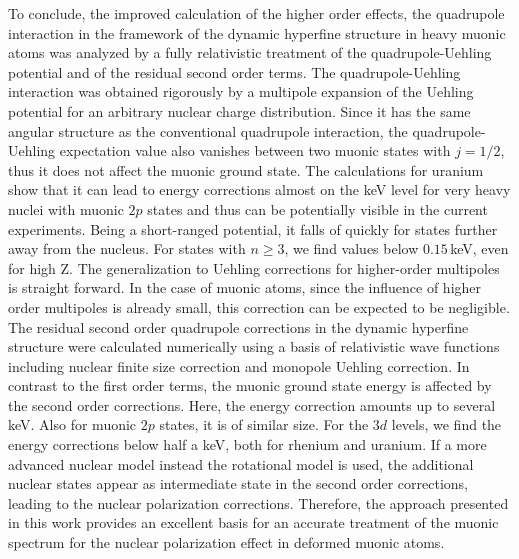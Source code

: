 To conclude, the improved calculation of the higher order effects, the quadrupole interaction in the framework of the dynamic hyperfine structure in heavy muonic atoms was analyzed by a fully relativistic treatment of the quadrupole-Uehling potential and of the residual second order terms.
The quadrupole-Uehling interaction was obtained rigorously by a multipole expansion of the Uehling potential for an arbitrary nuclear charge distribution.
Since it has the same angular structure as the conventional quadrupole interaction, the quadrupole-Uehling expectation value also vanishes between two muonic states with $j=1/2$, thus it does not affect the muonic ground state.
The calculations for uranium show that it can lead to energy corrections almost on the keV level for very heavy nuclei with muonic $2p$ states and thus can be potentially visible in the current experiments. Being a short-ranged potential, it falls of quickly for states further away from the nucleus. For states with $n\geq3$, we find values below $0.15\,$keV, even for high Z.
The generalization to Uehling corrections for higher-order multipoles is straight forward. In the case of muonic atoms, since the influence of higher order multipoles is already small, this correction can be expected to be negligible.
The residual second order quadrupole corrections in the dynamic hyperfine structure were calculated numerically using a basis of relativistic wave functions including nuclear finite size correction and monopole Uehling correction.
In contrast to the first order terms, the muonic ground state energy is affected by the second order corrections. Here, the energy correction amounts up to several keV. Also for muonic $2p$ states, it is of similar size. For the $3d$ levels, we find the energy corrections below half a keV, both for rhenium and uranium.
If a more advanced nuclear model instead the rotational model is used, the additional nuclear states appear as intermediate state in the second order corrections, leading to the nuclear polarization corrections. Therefore, the approach presented in this work provides an excellent basis for an accurate treatment of the muonic spectrum for the nuclear polarization effect in deformed muonic atoms.

